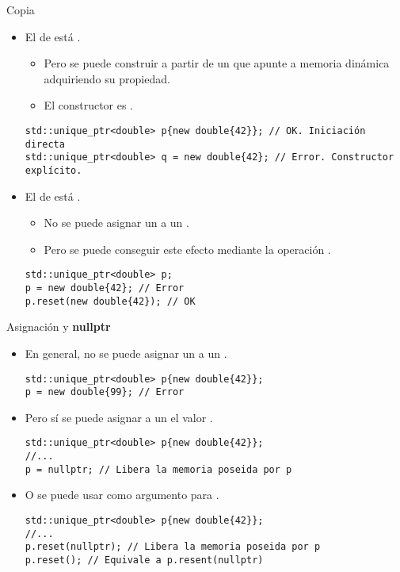 \begin{frame}[t,fragile]{Copia}
\begin{itemize}
  \item El  de  
        está .
    \begin{itemize}
      \item Pero se puede construir a partir de un 
            que apunte a memoria dinámica adquiriendo su propiedad.
      \item El constructor es .
    \end{itemize}
\begin{lstlisting}
std::unique_ptr<double> p{new double{42}}; // OK. Iniciación directa
std::unique_ptr<double> q = new double{42}; // Error. Constructor explícito.
\end{lstlisting}

  \item El  de 
        está .
    \begin{itemize}
      \item No se puede asignar un 
            a un .
      \item Pero se puede conseguir este efecto mediante la operación .
    \end{itemize}
\begin{lstlisting}
std::unique_ptr<double> p;
p = new double{42}; // Error
p.reset(new double{42}); // OK
\end{lstlisting}
\end{itemize}
\end{frame}

\begin{frame}[t,fragile]{Asignación y \textbf{nullptr}}
\begin{itemize}
  \item En general, no se puede asignar un  a un
        .
\begin{lstlisting}
std::unique_ptr<double> p{new double{42}};
p = new double{99}; // Error
\end{lstlisting}

  \item Pero sí se puede asignar a un  el valor .
\begin{lstlisting}
std::unique_ptr<double> p{new double{42}};
//...
p = nullptr; // Libera la memoria poseida por p
\end{lstlisting}

  \item O se puede usar  como argumento para .
\begin{lstlisting}
std::unique_ptr<double> p{new double{42}};
//...
p.reset(nullptr); // Libera la memoria poseida por p
p.reset(); // Equivale a p.resent(nullptr)
\end{lstlisting}
\end{itemize}
\end{frame}

